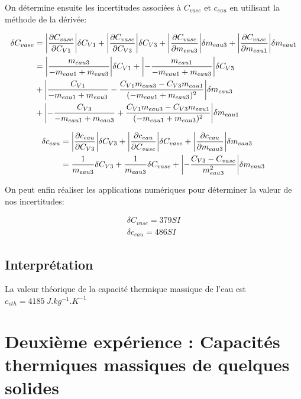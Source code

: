 \documentclass[12pt]{article}
\begin{document}
On détermine ensuite les incertitudes associées à $C_{vase}$ et $c_{eau}$ en utilisant la méthode de la dérivée:

\begin{align*}
	\delta C_{vase} & = \abs{\frac{\partial C_{vase}}{\partial C_{V1}}} \delta C_{V1} + \abs{\frac{\partial C_{vase}}{\partial C_{V3}}} \delta C_{V3} + \abs{\frac{\partial C_{vase}}{\partial m_{eau3}}} \delta m_{eau3} + \abs{\frac{\partial C_{vase}}{\partial m_{eau1}}} \delta m_{eau1} \\ 
	& = \abs{\frac{m_{eau3}}{-m_{eau1} + m_{eau3}}} \delta C_{V1}
	+ \abs{-\frac{m_{eau1}}{-m_{eau1} + m_{eau3}}} \delta C_{V3} \\
	& + \abs{\frac{C_{V1}}{-m_{eau1} + m_{eau3}} - \frac{C_{V1} m_{eau3} - C_{V3} m_{eau1}}{(-m_{eau1} + m_{eau3})^2}} \delta m_{eau3} \\
	& + \abs{-\frac{C_{V3}}{-m_{eau1} + m_{eau3}} + \frac{C_{V1} m_{eau3} - C_{V3} m_{eau1}}{(-m_{eau1} + m_{eau3})^2}} \delta m_{eau1} \\
\end{align*}

\begin{align*}
	\delta c_{eau} & = \abs{\frac{\partial c_{eau}}{\partial C_{V3}}} \delta C_{V3} + \abs{\frac{\partial c_{eau}}{\partial C_{vase}}} \delta C_{vase} + \abs{\frac{\partial c_{eau}}{\partial m_{eau3}}} \delta m_{eau3} \\
	& = \frac{1}{m_{eau3}} \delta C_{V3} + \frac{1}{m_{eau3}} \delta C_{vase} + \abs{-\frac{C_{V3} - C_{vase}}{m_{eau3}^2}} \delta m_{eau3} \\
\end{align*}

On peut enfin réaliser les applications numériques pour déterminer la valeur de nos incertitudes:

\begin{gather*}
	\delta C_{vase} = 379 SI \\
	\delta c_{eau} = 486 SI
\end{gather*}

\subsection{Interprétation}

La valeur théorique de la capacité thermique massique de l'eau est $c_{vth }=4185 ~ J.kg^{-1}.K^{-1}$

\newpage
\section{Deuxième expérience : Capacités thermiques massiques de quelques solides}
\end{document}
